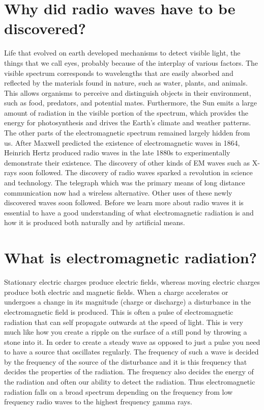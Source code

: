 \documentclass{../template/texnote}
\begin{document}
\section{Why did radio waves have to be discovered?}
Life that evolved on earth developed mechanisms to detect visible light, the things that we call eyes, probably because of the interplay of various factors. The visible spectrum corresponds to wavelengths that are easily absorbed and reflected by the materials found in nature, such as water, plants, and animals. This allows organisms to perceive and distinguish objects in their environment, such as food, predators, and potential mates. Furthermore, the Sun emits a large amount of radiation in the visible portion of the spectrum, which provides the energy for photosynthesis and drives the Earth's climate and weather patterns. The other parts of the electromagnetic spectrum remained largely hidden from us. After Maxwell predicted the existence of electromagnetic waves in 1864, Heinrich Hertz produced radio waves in the late 1880s to experimentally demonstrate their existence. The discovery of other kinds of EM waves such as X-rays soon followed. The discovery of radio waves sparked a revolution in science and technology. The telegraph which was the primary means of long distance communication now had a wireless alternative. Other uses of these newly discovered waves soon followed. Before we learn more about radio waves it is essential to have a good understanding of what electromagnetic radiation is and how it is produced both naturally and by artificial means.
\section{What is electromagnetic radiation?}
Stationary electric charges produce electric fields, whereas moving electric charges produce both electric and magnetic fields. When a charge accelerates or undergoes a change in its magnitude (charge or discharge) a disturbance in the electromagnetic field is produced. This is often a pulse of electromagnetic radiation that can self propagate outwards at the speed of light. This is very much like how you create a ripple on the surface of a still pond by throwing a stone into it. In order to create a steady wave as opposed to just a pulse you need to have a source that oscillates regularly. The frequency of such a wave is decided by the frequency of the source of the disturbance and it is this frequency that decides the properties of the radiation. The frequency also decides the energy of the radiation and often our ability to detect the radiation. Thus electromagnetic radiation falls on a broad spectrum depending on the frequency from low frequency radio waves to the highest frequency gamma rays.
\end{document}
